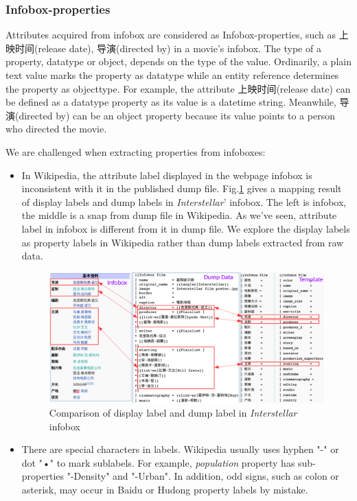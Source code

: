 \documentclass[runningheads,a4paper]{llncs}
\begin{document}
\subsubsection{Infobox-properties}
Attributes acquired from infobox are considered as Infobox-properties, such as 上映时间(release date), 导演(directed by) in a movie's infobox. The type of a property, datatype or object, depends on the type of the value. Ordinarily, a plain text value marks the property as datatype while an entity reference determines the property as objecttype. For example, the attribute 上映时间(release date) can be defined as a datatype property as its value is a datetime string. Meanwhile, 导演(directed by) can be an object property because its value points to a person who directed the movie.

We are challenged when extracting properties from infoboxes:
\begin{itemize}
    \item In Wikipedia, the attribute label displayed in the webpage infobox is inconsistent with it in the published dump file. Fig.\ref{fig:infobox-template} gives a mapping result of display labels and dump labels in \emph{Interstellar}' infobox. The left is infobox, the middle is a snap from dump file in Wikipedia. As we've seen, attribute label in infobox is different from it in dump file. We explore the display labels as property labels in Wikipedia rather than dump labels extracted from raw data.
    \begin{figure}[ht]
        \centerline{\includegraphics[width=1\columnwidth]{fig/infobox-template}}
        \caption{Comparison of display label and dump label in \emph{Interstellar} infobox}
        \label{fig:infobox-template}
    \end{figure}%
\item There are special characters in labels. Wikipedia usually uses hyphen "-" or dot "•" to mark sublabels. For example, \emph{population} property has sub-properties "-Density" and "-Urban". In addition, odd signs, such as colon or asterisk, may occur in Baidu or Hudong property labels by mistake.
\end{itemize}
\end{document}
